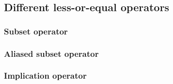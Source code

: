 \subsection{Different less-or-equal operators}
\subsubsection{Subset operator}
\subsubsection{Aliased subset operator}
\subsubsection{Implication operator}
